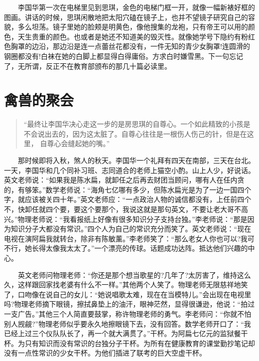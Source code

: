 \documentclass[12pt,UTF8]{ctexbook}
\begin{document}
　　李国华第一次在电梯里见到思琪，金色的电梯门框一开，就像一幅新裱好框的图画。讲话的时候，思琪闲散地把太阳穴磕在镜子上，也并不望镜子研究自己的容貌，多么坦荡。镜子里她的脸颊是明黄色，像他搜集的龙袍，只有帝王可以用的颜色，天生贵重的颜色。也或者是她还不知道美的毁灭性。就像她学号下隐约有粉红色胸罩的边沿，那边沿是连一点蕾丝花都没有，一件无知的青少女胸罩!连圆滑的钢圈都没有!白袜在她的白脚上都显得白得庸俗。方求白时嫌雪黑。下一句忘记了，无所谓，反正不在教育部颁布的那几十篇必读里。

\hypertarget{ux79bdux517dux7684ux805aux4f1a}{%
\section*{禽兽的聚会}\label{ux79bdux517dux7684ux805aux4f1a}}

\begin{quote}
\enquote{最终让李国华决心走这一步的是房思琪的自尊心。一个如此精致的小孩是 不会说出去的，因为这太脏了。自尊心往往是一根伤人伤己的针，但是在这里， 自尊心会缝起她的嘴。}
\end{quote}

　　那时候即将入秋，煞人的秋天。李国华一个礼拜有四天在南部，三天在台北。一天，李国华和几个同补习班、志同道合的老师上猫空小酌。山上人少，好说话。英文老师说：\enquote{如果我是陈水扁，就卸任之后再去财团当顾问，哪有人在任内贪的，有够笨。}数学老师说：\enquote{海角七亿哪有多少，但陈水扁光是为了一边一国四个字，就应该被关四十年。}英文老师应：\enquote{一点政治人物的诚信都没有，上任前四个不，快卸任就四个要，要这个要那个，我说这就是那句英文，不要让老大哥不高兴。}物理老师说：\enquote{我看报纸上好像有很多知识分子支持台独。}李老师说：\enquote{那是因为知识分子大都没有常识。}四个人为自己的常识充分而笑了。英文老师说：\enquote{现在电视在演阿扁我就转台，除非有陈敏薰。}李老师笑了：\enquote{那么老女人你也可以?我可不行，她长得太像我太太了。}一个漂亮的传球。话题成功达阵。抵达他们兴趣的中心。

　　英文老师问物理老师：\enquote{你还是那个想当歌星的?几年了?太厉害了，维持这么久，这样跟回家找老婆有什么不一样。}其他两个人笑了。物理老师无限慈祥地笑了，口吻像在说自己的女儿：\enquote{她说唱歌太难，现在在当模特儿。}会出现在电视里吗?物理老师摘下眼镜，擦拭鼻垫上的油汗，眼神茫然，显得很谦逊，他说：\enquote{拍过一支广告。}其他三个人简直要鼓掌，称许物理老师的勇气。李老师问：\enquote{你就不怕别人觊觎?}物理老师似乎要永久地擦眼镜下去，没有回答。数学老师开口了：\enquote{我已经上过三个仪队队长了，再一个就大满贯了。}干杯。为阿扁七亿元的监狱餐干杯。为只有知识而没有常识的台独分子干杯。为所有在健康教育的课堂勤抄笔记却没有一点性常识的少女干杯。为他们插进了联考的巨大空虚干杯。
\end{document}
